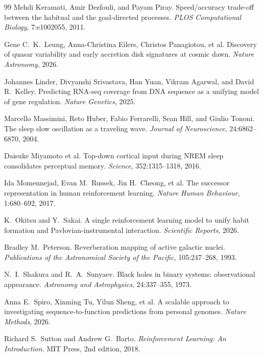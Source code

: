 \documentclass[12pt, a4paper]{article}
\theoremstyle{definition}
\begin{document}
\begin{thebibliography}{99}
Mehdi Keramati, Amir Dezfouli, and Payam Piray.
\newblock Speed/accuracy trade-off between the habitual and the goal-directed processes.
\newblock \textit{PLOS Computational Biology}, 7:e1002055, 2011.

Gene C.\ K.\ Leung, Anna-Christina Eilers, Christos Panagiotou, et al.
\newblock Discovery of quasar variability and early accretion disk signatures at cosmic dawn.
\newblock \textit{Nature Astronomy}, 2026.

Johannes Linder, Divyanshi Srivastava, Han Yuan, Vikram Agarwal, and David R.\ Kelley.
\newblock Predicting RNA-seq coverage from DNA sequence as a unifying model of gene regulation.
\newblock \textit{Nature Genetics}, 2025.

Marcello Massimini, Reto Huber, Fabio Ferrarelli, Sean Hill, and Giulio Tononi.
\newblock The sleep slow oscillation as a traveling wave.
\newblock \textit{Journal of Neuroscience}, 24:6862--6870, 2004.

Daisuke Miyamoto et al.
\newblock Top-down cortical input during NREM sleep consolidates perceptual memory.
\newblock \textit{Science}, 352:1315--1318, 2016.

Ida Momennejad, Evan M.\ Russek, Jin H.\ Cheong, et al.
\newblock The successor representation in human reinforcement learning.
\newblock \textit{Nature Human Behaviour}, 1:680--692, 2017.

K.\ Okitsu and Y.\ Sakai.
\newblock A single reinforcement learning model to unify habit formation and Pavlovian-instrumental interaction.
\newblock \textit{Scientific Reports}, 2026.

Bradley M.\ Peterson.
\newblock Reverberation mapping of active galactic nuclei.
\newblock \textit{Publications of the Astronomical Society of the Pacific}, 105:247--268, 1993.

N.\ I.\ Shakura and R.\ A.\ Sunyaev.
\newblock Black holes in binary systems: observational appearance.
\newblock \textit{Astronomy and Astrophysics}, 24:337--355, 1973.

Anna E.\ Spiro, Xinming Tu, Yilun Sheng, et al.
\newblock A scalable approach to investigating sequence-to-function predictions from personal genomes.
\newblock \textit{Nature Methods}, 2026.

Richard S.\ Sutton and Andrew G.\ Barto.
\newblock \textit{Reinforcement Learning: An Introduction}.
\newblock MIT Press, 2nd edition, 2018.


\end{thebibliography}
\end{document}
